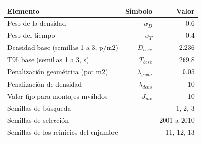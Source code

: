 \begin{tabular}{lrr}
\toprule
Elemento & Símbolo & Valor \\
\midrule
Peso de la densidad & $w_D$ & 0.6 \\
Peso del tiempo & $w_T$ & 0.4 \\
Densidad base (semillas 1 a 3, p/m2) & $D_{base}$ & 2.236 \\
T95 base (semillas 1 a 3, s) & $T_{base}$ & 269.8 \\
Penalización geométrica (por m2) & $\lambda_{geom}$ & 0.05 \\
Penalización de densidad & $\lambda_{dens}$ & 10 \\
Valor fijo para montajes inválidos & $J_{inv}$ & 10 \\
Semillas de búsqueda &  & 1, 2, 3 \\
Semillas de selección &  & 2001 a 2010 \\
Semillas de los reinicios del enjambre &  & 11, 12, 13 \\
\bottomrule
\end{tabular}
